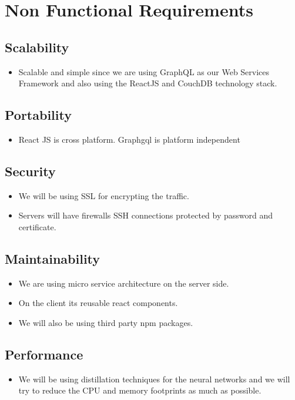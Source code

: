 \section{Non Functional Requirements}

\subsection{Scalability}
\begin{itemize}
    \item Scalable and simple since we are using GraphQL as our Web Services Framework and also using the ReactJS and CouchDB technology stack.
\end{itemize}

\subsection{Portability}
\begin{itemize}
    \item React JS is cross platform. Graphgql is platform independent
\end{itemize}

\subsection{Security}
\begin{itemize}
    \item We will be using SSL for encrypting the traffic.
    \item Servers will have firewalls SSH connections protected by password and certificate.
\end{itemize}

\subsection{Maintainability}
\begin{itemize}
    \item We are using micro service architecture on the server side.
    \item On the client its reusable react components.
    \item We will  also be using third party npm packages.
\end{itemize}

\subsection{Performance}
\begin{itemize}
    \item We will be using distillation techniques for the neural networks and we will try to reduce the CPU and memory footprints as much as possible.
\end{itemize}

